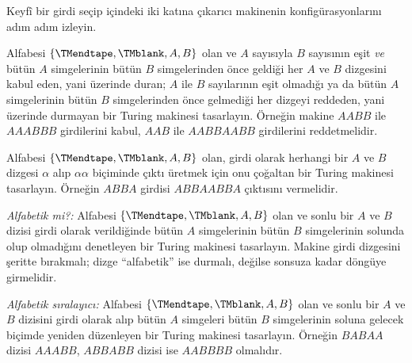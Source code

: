 \begin{prob}
Keyfî bir girdi seçip  içindeki iki katına
çıkarıcı makinenin konfigürasyonlarını adım adım izleyin.
\end{prob}

\begin{prob}
Alfabesi $\{\TMendtape,\TMblank,A,B\}$ olan ve $A$ sayısıyla $B$ sayısının
eşit \emph{ve} bütün $A$ simgelerinin bütün $B$ simgelerinden önce geldiği
her $A$ ve $B$ dizgesini kabul eden, yani üzerinde duran; $A$ ile $B$
sayılarının eşit olmadığı ya da bütün $A$ simgelerinin bütün $B$
simgelerinden önce gelmediği her dizgeyi reddeden, yani üzerinde durmayan bir
Turing makinesi tasarlayın. Örneğin makine $AABB$ ile $AAABBB$ girdilerini
kabul, $AAB$ ile $AABBAABB$ girdilerini reddetmelidir.
\end{prob}

\begin{prob}
Alfabesi $\{\TMendtape,\TMblank,A,B\}$ olan, girdi olarak herhangi bir
$A$ ve $B$ dizgesi $\alpha$ alıp $\alpha\alpha$ biçiminde çıktı üretmek için
onu çoğaltan bir Turing makinesi tasarlayın. Örneğin $ABBA$ girdisi
$ABBAABBA$ çıktısını vermelidir.
\end{prob}

\begin{prob}
\emph{Alfabetik mi?:} Alfabesi $\{\TMendtape,\TMblank,A,B\}$ olan ve sonlu
bir $A$ ve $B$ dizisi girdi olarak verildiğinde bütün $A$ simgelerinin bütün
$B$ simgelerinin solunda olup olmadığını denetleyen bir Turing makinesi
tasarlayın. Makine girdi dizgesini şeritte bırakmalı; dizge ``alfabetik'' ise
durmalı, değilse sonsuza kadar döngüye girmelidir.
\end{prob}

\begin{prob}
\emph{Alfabetik sıralayıcı:} Alfabesi
$\{\TMendtape,\TMblank,A,B\}$ olan ve sonlu bir $A$ ve $B$ dizisini girdi
olarak alıp bütün $A$ simgeleri bütün $B$ simgelerinin soluna gelecek biçimde
yeniden düzenleyen bir Turing makinesi tasarlayın. Örneğin $BABAA$ dizisi
$AAABB$, $ABBABB$ dizisi ise $AABBBB$ olmalıdır.
\end{prob}

